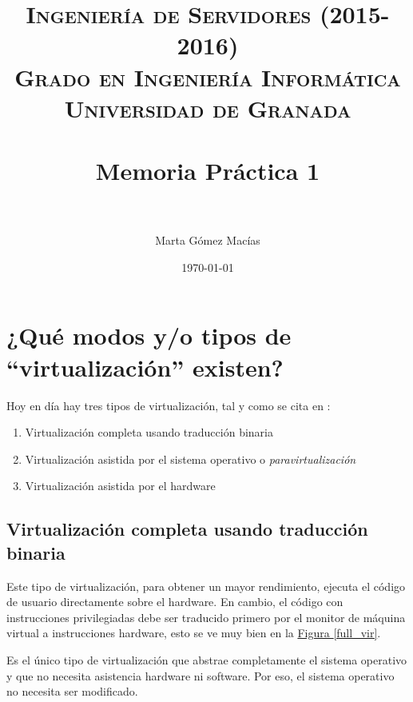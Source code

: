 \documentclass[10pt,a4paper,spanish]{article}
\title{
\normalfont \normalsize 
\textsc{{\bf Ingeniería de Servidores (2015-2016)} \\ Grado en Ingeniería Informática \\ Universidad de Granada} \\ [25pt] %
\horrule{0.5pt} \\[0.4cm] %
\huge Memoria Práctica 1 \\ %
\horrule{2pt} \\[0.5cm] %
}
\author{Marta Gómez Macías} %
\date{\normalsize\today} %
\numberwithin{equation}{section} %
\numberwithin{figure}{section} %
\numberwithin{table}{section} %
\begin{document}
\renewcommand{\listtablename}{Índice de tablas}
\renewcommand{\tablename}{Tabla} 

\maketitle %

\newpage %

\tableofcontents %

\listoffigures

\listoftables

\newpage


\section{¿Qué modos y/o tipos de ``virtualización'' existen?}
Hoy en día hay tres tipos de virtualización, tal y como se cita en \cite{vmware}:
\begin{enumerate}[$\bigstar$]
    \item Virtualización completa usando traducción binaria
    \item Virtualización asistida por el sistema operativo o \textit{paravirtualización}
    \item Virtualización asistida por el hardware
\end{enumerate}

\subsection{Virtualización completa usando traducción binaria}
Este tipo de virtualización, para obtener un mayor rendimiento, ejecuta el código de usuario directamente sobre el hardware. En cambio, el código con instrucciones privilegiadas debe ser traducido primero por el monitor de máquina virtual a instrucciones hardware, esto se ve muy bien en la \hyperref[full_vir]{Figura \ref*{full_vir}}.

Es el único tipo de virtualización que abstrae completamente el sistema operativo y que no necesita asistencia hardware ni software. Por eso, el sistema operativo no necesita ser modificado.
\end{document}
